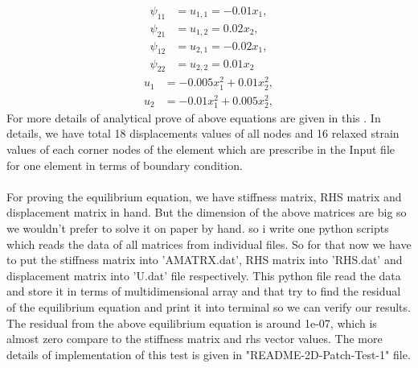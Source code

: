 \documentclass[12pt]{article}
\begin{document}
\begin{equation}\label{p_psi}
	\begin{aligned}
		\psi_{11} &= u_{1,1} = -0.01x_1, \\
		\psi_{21} &= u_{1,2} =  0.02x_2, \\
		\psi_{12} &= u_{2,1} = -0.02x_1, \\
		\psi_{22} &= u_{2,2} =  0.01x_2 
	\end{aligned}
\end{equation}
\begin{equation}
	\begin{aligned}
		u_1 &= -0.005x_1^2 + 0.01x_2^2, \\
		u_2 &= -0.01x_1^2 + 0.005x_2^2,
	\end{aligned}
\end{equation}
For more details of analytical prove of above equations are given in this \cite{Lzybell2007}.
In details, we have total 18 displacements values of all nodes and 16 relaxed strain values of each corner nodes of the element which are prescribe in the Input file for one element in terms of boundary condition.  
\\ 
\\
For proving the equilibrium equation, we have stiffness matrix, RHS matrix and displacement matrix in hand. But the dimension of the above matrices are big so we wouldn't prefer to solve it on paper by hand. so i write one python scripts which reads the data of all matrices from individual files. So for that now we have to put the stiffness matrix into 'AMATRX.dat', RHS matrix into 'RHS.dat' and displacement matrix into 'U.dat' file respectively. This python file read the data and store it in terms of multidimensional array and that try to find the residual of the equilibrium equation and print it into terminal so we can verify our results. The residual from the above equilibrium equation is around 1e-07, which is almost zero compare to the stiffness matrix and rhs vector values. The more details of implementation of this test is given in "README-2D-Patch-Test-1" file.
\end{document}

